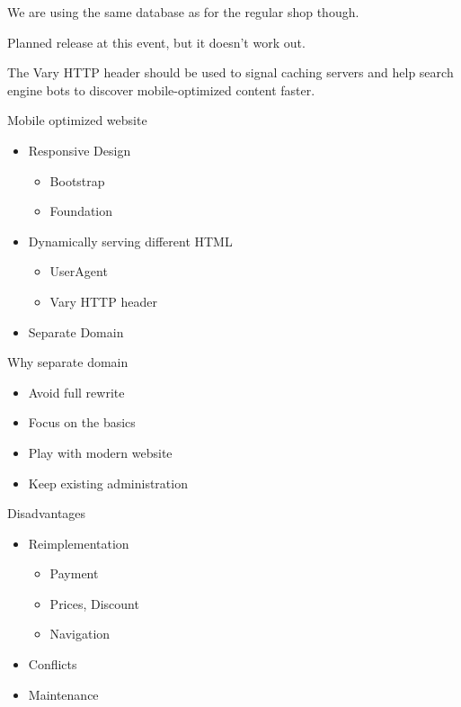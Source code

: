We are using the same database as for the regular shop though.

Planned release at this event, but it doesn't work out.

The Vary HTTP header should be used to signal caching servers
and help search engine bots to discover mobile-optimized content
faster.

\begin{frame}{Mobile optimized website}
\begin{itemize}
\item Responsive Design
\begin{itemize}
  \item Bootstrap
  \item Foundation
\end{itemize}
\item Dynamically serving different HTML
\begin{itemize}
  \item UserAgent
  \item Vary HTTP header
\end{itemize}
\item Separate Domain
\end{itemize}
\end{frame}

\begin{frame}{Why separate domain}
\begin{itemize}
\item Avoid full rewrite 
\item Focus on the basics
\item Play with modern website
\item Keep existing administration
\end{itemize}
\end{frame}

\begin{frame}{Disadvantages}
\begin{itemize}
\item Reimplementation
\begin{itemize}
\item Payment
\item Prices, Discount
\item Navigation
\end{itemize}
\item Conflicts
\item Maintenance
\end{itemize}
\end{frame}

